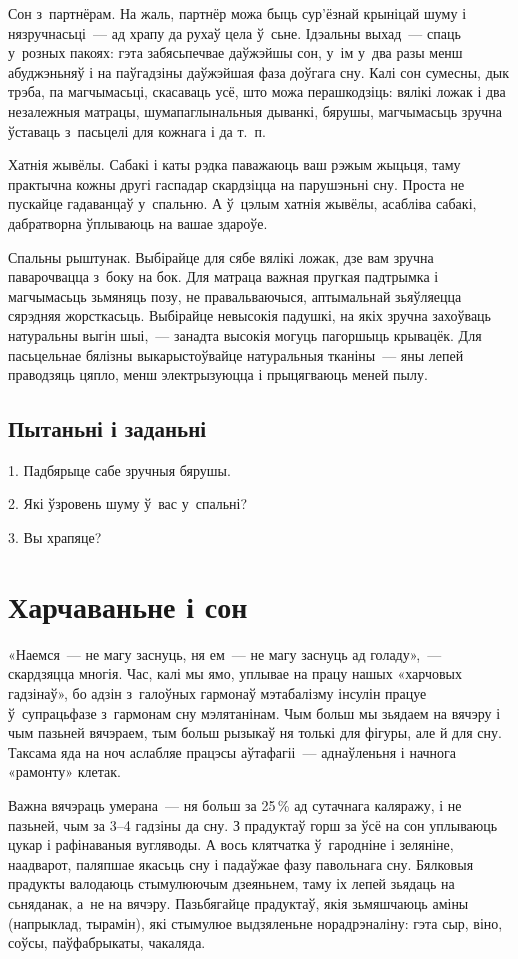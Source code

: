 Сон з~партнёрам. На жаль, партнёр можа быць сур'ёзнай крыніцай шуму і нязручнасьці~--- ад храпу да рухаў цела ў~сьне. Ідэальны выхад~--- спаць у~розных пакоях: гэта забясьпечвае даўжэйшы сон, у~ім у~два разы менш абуджэньняў і на паўгадзіны даўжэйшая фаза доўгага сну. Калі сон сумесны, дык трэба, па магчымасьці, скасаваць усё, што можа перашкодзіць: вялікі ложак і два незалежныя матрацы, шумапаглынальныя дыванкі, бярушы, магчымасьць зручна ўставаць з~пасьцелі для кожнага і да т.~п.

Хатнія жывёлы. Сабакі і каты рэдка паважаюць ваш рэжым жыцьця, таму практычна кожны другі гаспадар скардзіцца на парушэньні сну. Проста не пускайце гадаванцаў у~спальню. А ў~цэлым хатнія жывёлы, асабліва сабакі, дабратворна ўплываюць на вашае здароўе.

Спальны рыштунак. Выбірайце для сябе вялікі ложак, дзе вам зручна паварочвацца з~боку на бок. Для матраца важная пругкая падтрымка і магчымасьць зьмяняць позу, не правальваючыся, аптымальнай зьяўляецца сярэдняя жорсткасьць. Выбірайце невысокія падушкі, на якіх зручна захоўваць натуральны выгін шыі,~--- занадта высокія могуць пагоршыць крывацёк. Для пасьцельнае бялізны выкарыстоўвайце натуральныя тканіны~--- яны лепей праводзяць цяпло, менш электрызуюцца і прыцягваюць меней пылу.

\subsection*{Пытаньні і заданьні}

1. Падбярыце сабе зручныя бярушы.

2. Які ўзровень шуму ў~вас у~спальні?

3. Вы храпяце?


\section{Харчаваньне і сон}

«Наемся~--- не магу заснуць, ня ем~--- не магу заснуць ад голаду»,~--- скардзяцца многія. Час, калі мы ямо, уплывае на працу нашых «харчовых гадзінаў», бо адзін з~галоўных гармонаў мэтабалізму інсулін працуе ў~супрацьфазе з~гармонам сну мэлятанінам. Чым больш мы зьядаем на вячэру і чым пазьней вячэраем, тым больш рызыкаў ня толькі для фігуры, але й для сну. Таксама яда на ноч аслабляе працэсы аўтафагіі~--- аднаўленьня і начнога «рамонту» клетак.

Важна вячэраць умерана~--- ня больш за 25\,\% ад сутачнага каляражу, і не пазьней, чым за 3--4 гадзіны да сну. З прадуктаў горш за ўсё на сон уплываюць цукар і рафінаваныя вугляводы. А вось клятчатка ў~гародніне і зеляніне, наадварот, паляпшае якасьць сну і падаўжае фазу павольнага сну. Бялковыя прадукты валодаюць стымулюючым дзеяньнем, таму іх лепей зьядаць на сьняданак, а~не на вячэру. Пазьбягайце прадуктаў, якія зьмяшчаюць аміны (напрыклад, тырамін), які стымулюе выдзяленьне норадрэналіну: гэта сыр, віно, соўсы, паўфабрыкаты, чакаляда.

